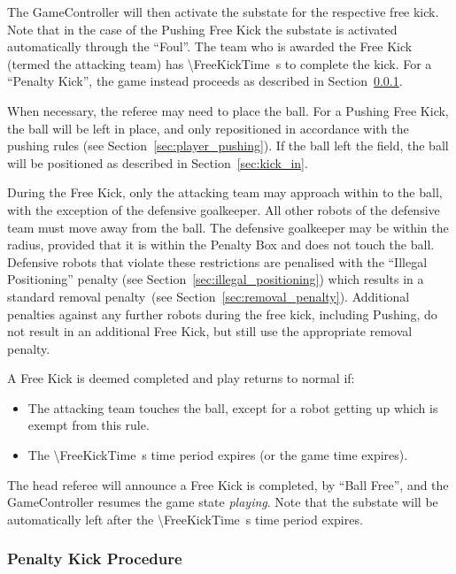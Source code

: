 The GameController will then activate the substate for the respective free kick. Note that in the case of the Pushing Free Kick the substate is activated automatically through the ``Foul''.
The team who is awarded the Free Kick (termed the attacking team) has \qty{\FreeKickTime}{\second} to complete the kick.
For a ``Penalty Kick'', the game instead proceeds as described in Section~\ref{sec:penalty_free_kick}.

When necessary, the referee may need to place the ball.
For a Pushing Free Kick, the ball will be left in place, and only repositioned in accordance with the pushing rules (see Section~\ref{sec:player_pushing}).
If the ball left the field, the ball will be positioned as described in Section~\ref{sec:kick_in}.

During the Free Kick, only the attacking team may approach within \FreeKickRadius to the ball, with the exception of the defensive goalkeeper. All other robots of the defensive team must move away from the ball. The defensive goalkeeper may be within the \FreeKickRadius radius, provided that it is within the Penalty Box and does not touch the ball. Defensive robots that violate these restrictions are penalised with the ``Illegal Positioning'' penalty (see Section~\ref{sec:illegal_positioning}) which results in a standard removal penalty~(see Section~\ref{sec:removal_penalty}).
Additional penalties against any further robots during the free kick, including Pushing, do not result in an additional Free Kick, but still use the appropriate removal penalty.

A Free Kick is deemed completed and play returns to normal if:
\begin{itemize}
    \item The attacking team touches the ball, except for a robot getting up which is exempt from this rule.
    \item The \qty{\FreeKickTime}{\second} time period expires (or the game time expires).
\end{itemize}
The head referee will announce a Free Kick is completed, by ``Ball Free'', and the GameController resumes the game state \emph{playing}. Note that the substate will be automatically left after the \qty{\FreeKickTime}{\second} time period expires.

\subsubsection{Penalty Kick Procedure}
\label{sec:penalty_free_kick}

